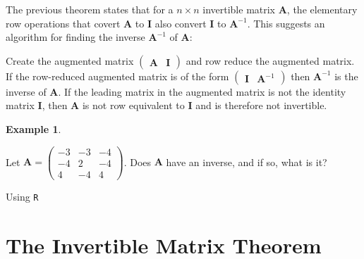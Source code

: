 \documentclass[
]{book}
\theoremstyle{definition}
\theoremstyle{definition}
\newtheorem{example}{Example}[chapter]
\theoremstyle{definition}
\theoremstyle{remark}
\begin{document}
The previous theorem states that for a \(n \times n\) invertible matrix \(\mathbf{A}\), the elementary row operations that covert \(\mathbf{A}\) to \(\mathbf{I}\) also convert \(\mathbf{I}\) to \(\mathbf{A}^{-1}\). This suggests an algorithm for finding the inverse \(\mathbf{A}^{-1}\) of \(\mathbf{A}\):

Create the augmented matrix \(\begin{pmatrix} \mathbf{A} & \mathbf{I} \end{pmatrix}\) and row reduce the augmented matrix. If the row-reduced augmented matrix is of the form \(\begin{pmatrix} \mathbf{I} & \mathbf{A}^{-1} \end{pmatrix}\) then \(\mathbf{A}^{-1}\) is the inverse of \(\mathbf{A}\). If the leading matrix in the augmented matrix is not the identity matrix \(\mathbf{I}\), then \(\mathbf{A}\) is not row equivalent to \(\mathbf{I}\) and is therefore not invertible.

\begin{example}
\protect\hypertarget{exm:unlabeled-div-78}{}\label{exm:unlabeled-div-78}

Let \(\mathbf{A} = \begin{pmatrix} -3 & -3 & -4 \\ -4 & 2 & -4 \\ 4 & -4 & 4 \end{pmatrix}\). Does \(\mathbf{A}\) have an inverse, and if so, what is it?

Using \texttt{R}

\end{example}

\hypertarget{the-invertible-matrix-theorem}{%
\section{The Invertible Matrix Theorem}\label{the-invertible-matrix-theorem}}
\end{document}
